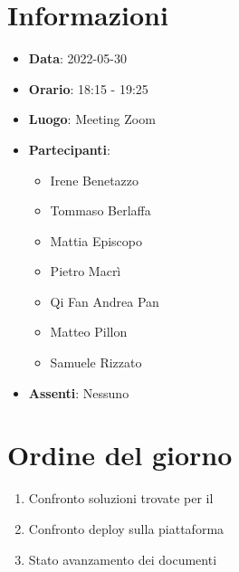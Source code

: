 \section{Informazioni}
	\begin{itemize}
		\item \textbf{Data}: 2022-05-30    %
		\item \textbf{Orario}: 18:15 - 19:25      %
		\item \textbf{Luogo}: Meeting Zoom
		\item \textbf{Partecipanti}:
		\begin{itemize}
			\item Irene Benetazzo
			\item Tommaso Berlaffa
			\item Mattia Episcopo
			\item Pietro Macrì
			\item Qi Fan Andrea Pan
			\item Matteo Pillon
			\item Samuele Rizzato
		\end{itemize}
        \item \textbf{Assenti}: Nessuno
	\end{itemize}
    
	\section{Ordine del giorno}
	\begin{enumerate}
		\item Confronto soluzioni trovate per il 
  		\item Confronto deploy sulla piattaforma 
      	\item Stato avanzamento dei documenti
	\end{enumerate}
	\newpage